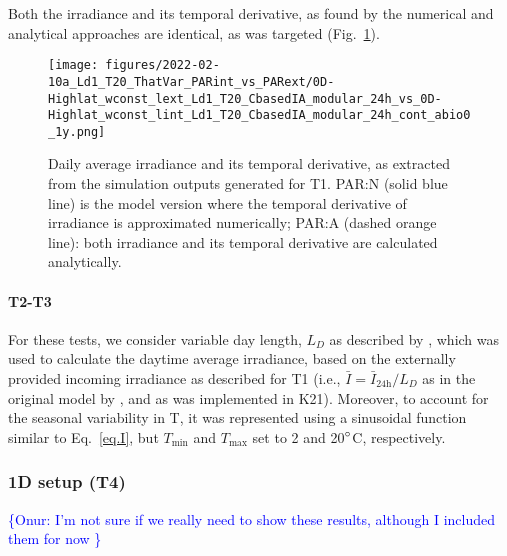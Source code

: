 \documentclass[gmd, manuscript]{copernicus}
\newcommand{\onur}[1]{\textcolor{blue}{\{Onur: #1\}}}
\begin{document}
    Both the irradiance and its temporal derivative, as found by the numerical and analytical approaches are identical, as was targeted (Fig.~\ref{f.T1light}).
    \begin{figure}[ht!]
    \texttt{[image: figures/2022-02-10a\_Ld1\_T20\_ThatVar\_PARint\_vs\_PARext/0D-Highlat\_wconst\_lext\_Ld1\_T20\_CbasedIA\_modular\_24h\_vs\_0D-Highlat\_wconst\_lint\_Ld1\_T20\_CbasedIA\_modular\_24h\_cont\_abio0\_1y.png]}
    \caption{Daily average irradiance and its temporal derivative, as extracted from the simulation outputs generated for T1. PAR:N (solid blue line) is the model version where the temporal derivative of irradiance is approximated numerically; PAR:A (dashed orange line): both irradiance and its temporal derivative are calculated analytically.\label{f.T1light}}
    \end{figure}

    
    \paragraph{T2-T3}
    For these tests, we consider variable day length, $L_D$ as described by \citet{Forsythe2003}, which was used to calculate the daytime average irradiance, based on the externally provided incoming irradiance as described for T1 (i.e., $\bar{I}=\bar{I}_{\text{24h}}/L_D$ as in the original model by \citep{Pahlowetal13}, and as was implemented in K21). Moreover, to account for the seasonal variability in T, it was represented using a sinusoidal function similar to Eq.~\ref{eq.I}, but $T_{\min}$ and $T_{\max}$ set to 2 and 20$^{\circ}$C, respectively.
    
\subsubsection{1D setup (T4)}
    \onur{I'm not sure if we really need to show these results, although I included them for now }



\end{document}
